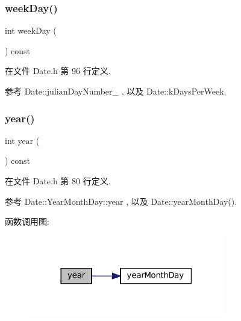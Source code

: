 \subsubsection{\texorpdfstring{week\+Day()}{weekDay()}}
{\footnotesize\ttfamily int week\+Day (\begin{DoxyParamCaption}{ }\end{DoxyParamCaption}) const\hspace{0.3cm}{\ttfamily [inline]}}



在文件 Date.\+h 第 96 行定义.



参考 Date\+::julian\+Day\+Number\+\_\+ , 以及 Date\+::k\+Days\+Per\+Week.

\mbox{\label{classmuduo_1_1Date_a1b5cb174b9b809888ca1cadfb32791f4}} 
\subsubsection{\texorpdfstring{year()}{year()}}
{\footnotesize\ttfamily int year (\begin{DoxyParamCaption}{ }\end{DoxyParamCaption}) const\hspace{0.3cm}{\ttfamily [inline]}}



在文件 Date.\+h 第 80 行定义.



参考 Date\+::\+Year\+Month\+Day\+::year , 以及 Date\+::year\+Month\+Day().

函数调用图\+:
\nopagebreak
\begin{figure}[H]
\begin{center}
\leavevmode
\includegraphics[width=242pt]{classmuduo_1_1Date_a1b5cb174b9b809888ca1cadfb32791f4_cgraph}
\end{center}
\end{figure}
\mbox{\label{classmuduo_1_1Date_ae6a6f4dbc56d9751b6c96d1756a0cece}} 
